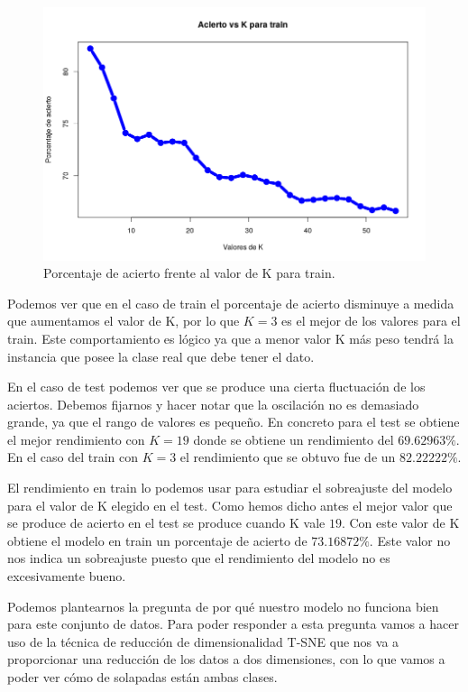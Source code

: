 \documentclass[12pt,a4paper]{article}
\begin{document}
\begin{figure}[H]
	\centering
	\includegraphics[scale=0.6]{./Imagenes/Clasificacion/knn2.png}
	\caption{Porcentaje de acierto frente al valor de K para train.}
\end{figure}

Podemos ver que en el caso de train el porcentaje de acierto disminuye a medida que aumentamos el valor de K, por lo que $K=3$ es el mejor de los valores para el train. Este comportamiento es lógico ya que a menor valor K más peso tendrá la instancia que posee la clase real que debe tener el dato. 

En el caso de test podemos ver que se produce una cierta fluctuación de los aciertos. Debemos fijarnos y hacer notar que la oscilación no es demasiado grande, ya que el rango de valores es pequeño. En concreto para el test se obtiene el mejor rendimiento con $K=19$ donde se obtiene un rendimiento del $69.62963\%$. En el caso del train con $K=3$ el rendimiento que se obtuvo fue de un $82.22222\%$. 

El rendimiento en train lo podemos usar para estudiar el sobreajuste del modelo para el valor de K elegido en el test. Como hemos dicho antes el mejor valor que se produce de acierto en el test se produce cuando K vale $19$. Con este valor de K obtiene el modelo en train un porcentaje de acierto de $73.16872\%$. Este valor no nos indica un sobreajuste puesto que el rendimiento del modelo no es excesivamente bueno.

Podemos plantearnos la pregunta de por qué nuestro modelo no funciona bien para este conjunto de datos. Para poder responder a esta pregunta vamos a hacer uso de la técnica de reducción de dimensionalidad T-SNE que nos va a proporcionar una reducción de los datos a dos dimensiones, con lo que vamos a poder ver cómo de solapadas están ambas clases.
\end{document}
